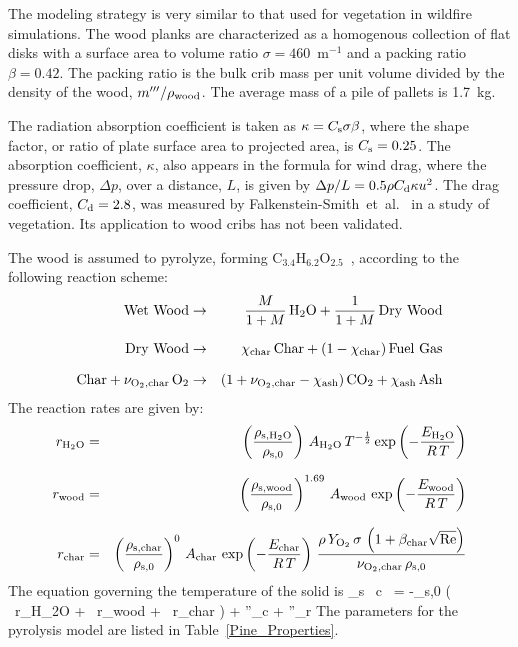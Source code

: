 The modeling strategy is very similar to that used for vegetation in wildfire simulations. The wood planks are characterized as a homogenous collection of flat disks with a surface area to volume ratio $\sigma=460$~m$^{-1}$ and a packing ratio $\beta=0.42$. The packing ratio is the bulk crib mass per unit volume divided by the density of the wood, $m'''/\rho_{\rm wood}$. The average mass of a pile of pallets is 1.7~kg.

The radiation absorption coefficient is taken as $\kappa=C_{\rm s} \sigma \beta$, where the shape factor, or ratio of plate surface area to projected area, is $C_{\rm s}=0.25$. The absorption coefficient, $\kappa$, also appears in the formula for wind drag, where the pressure drop, $\Delta p$, over a distance, $L$, is given by $\Delta p / L = 0.5 \rho C_{\rm d} \kappa u^2$. The drag coefficient, $C_{\rm d}=2.8$, was measured by Falkenstein-Smith~et~al.~\cite{Falkenstein-Smith:2018} in a study of vegetation. Its application to wood cribs has not been validated.

The wood is assumed to pyrolyze, forming C$_{3.4}$H$_{6.2}$O$_{2.5}$~\cite{Ritchie:1}, according to the following reaction scheme:
\begin{eqnarray}
 {\rm Wet\ Wood} & \rightarrow & \frac{M}{1+M} \, {\rm H_2O} + \frac{1}{1+M} \, {\rm Dry\ Wood} \\[.1in]
 {\rm Dry\ Wood} & \rightarrow & \chi_{\rm char} \, {\rm Char} + (1-\chi_{\rm char}) \, {\rm Fuel\ Gas} \\[.1in]
 {\rm Char} + \nu_{\rm O_2, char} \, {\rm O_2} & \rightarrow & (1+ \nu_{\rm O_2,char} - \chi_{\rm ash}) \, {\rm CO_2} + \chi_{\rm ash} \, {\rm Ash}
\end{eqnarray}
The reaction rates are given by:
\begin{eqnarray}
  r_{\rm H_2O} &=& \left( \frac{\rho_{\rm s,H_2O}}{\rho_{\rm s,0}} \right)        \, A_{\rm H_2O} \, T^{-\frac{1}{2}} \exp \left(  -\frac{E_{\rm H_2O}}{R \, T} \right)  \\[.1in]
  r_{\rm wood} &=& \left( \frac{\rho_{\rm s,wood}}{\rho_{\rm s,0}} \right)^{1.69} \, A_{\rm wood} \,                  \exp \left(  -\frac{E_{\rm wood}}{R \, T} \right)   \\[.1in]
  r_{\rm char} &=& \left( \frac{\rho_{\rm s,char}}{\rho_{\rm s,0}} \right)^0      \, A_{\rm char} \,                  \exp \left(  -\frac{E_{\rm char}}{R \, T} \right) \,
  \frac{ \rho \, Y_{\rm O_2} \, \sigma \, \left( 1+\beta_{\rm char}\sqrt{\hbox{Re}} \right) }{\nu_{\rm O_2,char} \, \rho_{\rm s,0} }
\end{eqnarray}
The equation governing the temperature of the solid is
\be
\rho_{\rm s} \, c \,  = -\rho_{\rm s,0} \left( \ r_{\rm H_2O} + \ r_{\rm wood} +  \ r_{\rm char} \right) + \nabla {}''_{\rm c}  +  \nabla {}''_{\rm r}
\ee
The parameters for the pyrolysis model are listed in Table~\ref{Pine_Properties}.

